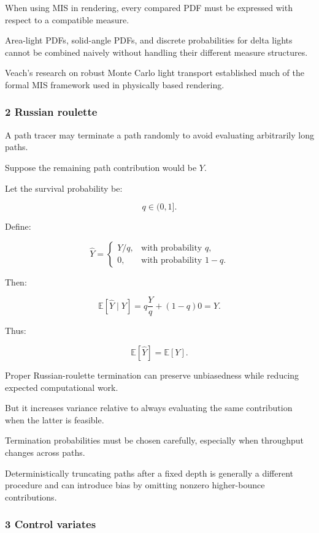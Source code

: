 When using MIS in rendering, every compared PDF must be expressed with respect to a compatible measure.

Area-light PDFs, solid-angle PDFs, and discrete probabilities for delta lights cannot be combined naively without handling their different measure structures.

Veach's research on robust Monte Carlo light transport established much of the formal MIS framework used in physically based rendering.

\subsubsection{2 Russian roulette}\label{02-foundations-ii-ch031-russian-roulette}

\hypertarget{02-foundations-ii-ch031-russian-roulette}{}

A path tracer may terminate a path randomly to avoid evaluating arbitrarily long paths.

Suppose the remaining path contribution would be \(Y\).

Let the survival probability be:

\[
 q\in(0,1].
\]

Define:

\[
 \widehat Y= \begin{cases} Y/q,&\text{with probability }q,\\ 0,&\text{with probability }1-q. \end{cases}
\]

Then:

\[
 \mathbb E[\widehat Y\mid Y] = q\frac Yq+(1-q)0 =Y.
\]

Thus:

\[
 \boxed{ \mathbb E[\widehat Y]=\mathbb E[Y] }.
\]

Proper Russian-roulette termination can preserve unbiasedness while reducing expected computational work.

But it increases variance relative to always evaluating the same contribution when the latter is feasible.

Termination probabilities must be chosen carefully, especially when throughput changes across paths.

Deterministically truncating paths after a fixed depth is generally a different procedure and can introduce bias by omitting nonzero higher-bounce contributions.

\subsubsection{3 Control variates}\label{02-foundations-ii-ch031-control-variates}

